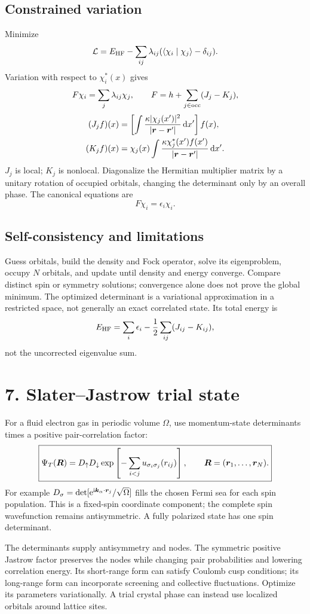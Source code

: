 \subsection*{Constrained variation}
Minimize
\[
\mathcal L=E_{\rm HF}-\sum_{ij}\lambda_{ij}
(\langle\chi_i\mid\chi_j\rangle-\delta_{ij}).
\]
Variation with respect to $\chi_i^*(x)$ gives
\[
F\chi_i=\sum_j\lambda_{ij}\chi_j,\qquad F=h+\sum_{j\in\rm occ}(J_j-K_j),
\]
\begin{align*}
(J_jf)(x)&=\left[\int\frac{\kappa|\chi_j(x')|^2}{|\boldsymbol{r}-\boldsymbol{r}'|}\mathop{}\!\mathrm{d} x'\right]f(x),\\
(K_jf)(x)&=\chi_j(x)\int\frac{\kappa\chi_j^*(x')f(x')}{|\boldsymbol{r}-\boldsymbol{r}'|}\mathop{}\!\mathrm{d} x'.
\end{align*}
$J_j$ is local; $K_j$ is nonlocal. Diagonalize the Hermitian multiplier matrix by a unitary rotation of occupied orbitals, changing the determinant only by an overall phase. The canonical equations are
\[
\boxed{F\chi_i=\epsilon_i\chi_i.}
\]

\subsection*{Self-consistency and limitations}
Guess orbitals, build the density and Fock operator, solve its eigenproblem, occupy $N$ orbitals, and update until density and energy converge. Compare distinct spin or symmetry solutions; convergence alone does not prove the global minimum. The optimized determinant is a variational approximation in a restricted space, not generally an exact correlated state. Its total energy is
\[
E_{\rm HF}=\sum_i\epsilon_i-\frac12\sum_{ij}(J_{ij}-K_{ij}),
\]
not the uncorrected eigenvalue sum.

\section*{7. Slater--Jastrow trial state}
For a fluid electron gas in periodic volume $\Omega$, use momentum-state determinants times a positive pair-correlation factor:
\[
\boxed{\Psi_T(\boldsymbol{R})=D_\uparrow D_\downarrow
\exp\left[-\sum_{i<j}u_{\sigma_i\sigma_j}(r_{ij})\right],\qquad
\boldsymbol{R}=(\boldsymbol{r}_1,\ldots,\boldsymbol{r}_N).}
\]
For example $D_\sigma=\det[\mathrm{e}^{\mathrm{i}\boldsymbol{k}_\alpha\cdot\boldsymbol{r}_j}/\sqrt\Omega]$ fills the chosen Fermi sea for each spin population. This is a fixed-spin coordinate component; the complete spin wavefunction remains antisymmetric. A fully polarized state has one spin determinant.

The determinants supply antisymmetry and nodes. The symmetric positive Jastrow factor preserves the nodes while changing pair probabilities and lowering correlation energy. Its short-range form can satisfy Coulomb cusp conditions; its long-range form can incorporate screening and collective fluctuations. Optimize its parameters variationally. A trial crystal phase can instead use localized orbitals around lattice sites.

